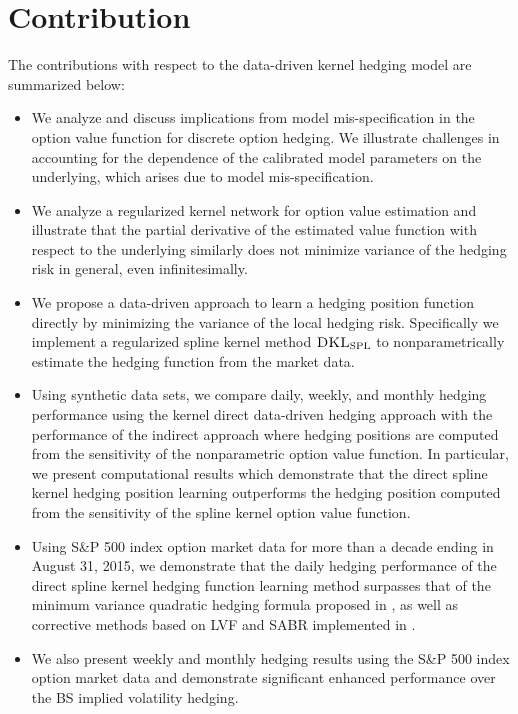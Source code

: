 \documentclass[letterpaper,12pt,titlepage,oneside,final]{book}
\numberwithin{equation}{section}
\theoremstyle{definition}
\newcommand{\DKLs}{\bf\textsc{DKL}_{\text{SPL}}}
\begin{document}
\section{Contribution}
The contributions with respect to the data-driven kernel hedging model \cite{knian2017} are summarized below:
\begin{itemize}
\item We analyze and discuss implications from model mis-specification in the option value function for discrete option hedging. We illustrate challenges in accounting for the dependence of the calibrated model parameters on the underlying, which arises due to  model mis-specification.

\item We analyze a regularized kernel network for option value estimation and illustrate that  the partial derivative of the estimated value function with respect to the underlying similarly does not minimize variance of the hedging risk in general, even infinitesimally.

\item We propose a data-driven approach to learn a hedging position function directly by minimizing the variance of the local hedging  risk.
    Specifically we implement a regularized spline kernel method $\DKLs$ to nonparametrically estimate the hedging function from the market data.

\item Using synthetic data sets, we compare daily, weekly, and monthly hedging performance using
   the kernel direct data-driven hedging approach with the performance of the indirect approach where hedging positions are computed from the sensitivity of the nonparametric option value function. In particular, we present computational results which demonstrate that the direct spline kernel hedging position learning outperforms the hedging position computed from the sensitivity of the spline kernel option value function.

\item Using  S\&P 500 index option market data for more than a decade ending in August 31, 2015, we demonstrate that the  daily hedging performance of the direct spline kernel hedging function learning method   surpasses that of the   minimum variance quadratic hedging formula proposed in \citep{hulloptimal},  as well as corrective methods based on LVF and SABR implemented in  \citep{hulloptimal}.

\item We also present weekly and monthly hedging results using the  S\&P 500 index option market data and demonstrate significant enhanced performance over the BS implied volatility hedging.
\end{itemize}
\end{document}
